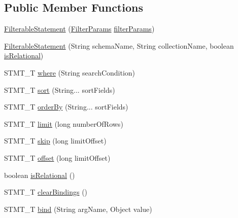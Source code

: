 \subsection*{Public Member Functions}
\begin{DoxyCompactItemize}
\item 
\mbox{\hyperlink{classcom_1_1mysql_1_1cj_1_1xdevapi_1_1_filterable_statement_a1f4bdf85b4c7e6abd086fe6b8d168b66}{Filterable\+Statement}} (\mbox{\hyperlink{classcom_1_1mysql_1_1cj_1_1xdevapi_1_1_filter_params}{Filter\+Params}} \mbox{\hyperlink{classcom_1_1mysql_1_1cj_1_1xdevapi_1_1_filterable_statement_a0004223ee831ad799fd8c17dec2dc7f9}{filter\+Params}})
\item 
\mbox{\hyperlink{classcom_1_1mysql_1_1cj_1_1xdevapi_1_1_filterable_statement_ab040aebeabb9d97f1ea205bc9c4c4230}{Filterable\+Statement}} (String schema\+Name, String collection\+Name, boolean \mbox{\hyperlink{classcom_1_1mysql_1_1cj_1_1xdevapi_1_1_filterable_statement_a0fc92f86e2ee374cbf5c7fe66d7c7dea}{is\+Relational}})
\item 
S\+T\+M\+T\+\_\+T \mbox{\hyperlink{classcom_1_1mysql_1_1cj_1_1xdevapi_1_1_filterable_statement_a358165df9da77ebe27c3b18414a13747}{where}} (String search\+Condition)
\item 
S\+T\+M\+T\+\_\+T \mbox{\hyperlink{classcom_1_1mysql_1_1cj_1_1xdevapi_1_1_filterable_statement_ad2f31a6534645c0b82b1c71693ddd8f6}{sort}} (String... sort\+Fields)
\item 
S\+T\+M\+T\+\_\+T \mbox{\hyperlink{classcom_1_1mysql_1_1cj_1_1xdevapi_1_1_filterable_statement_a33cd3395bdf36bd42e3e5c6c25b79d0e}{order\+By}} (String... sort\+Fields)
\item 
S\+T\+M\+T\+\_\+T \mbox{\hyperlink{classcom_1_1mysql_1_1cj_1_1xdevapi_1_1_filterable_statement_a563edf1d31caf5e5244fef079b37604f}{limit}} (long number\+Of\+Rows)
\item 
S\+T\+M\+T\+\_\+T \mbox{\hyperlink{classcom_1_1mysql_1_1cj_1_1xdevapi_1_1_filterable_statement_ac3e56b485f1b7ec38f0d3d57313b0e3d}{skip}} (long limit\+Offset)
\item 
S\+T\+M\+T\+\_\+T \mbox{\hyperlink{classcom_1_1mysql_1_1cj_1_1xdevapi_1_1_filterable_statement_a6ca59bb68ddc2a7900137900cdb219c8}{offset}} (long limit\+Offset)
\item 
boolean \mbox{\hyperlink{classcom_1_1mysql_1_1cj_1_1xdevapi_1_1_filterable_statement_a0fc92f86e2ee374cbf5c7fe66d7c7dea}{is\+Relational}} ()
\item 
S\+T\+M\+T\+\_\+T \mbox{\hyperlink{classcom_1_1mysql_1_1cj_1_1xdevapi_1_1_filterable_statement_a6f81659cd181c72dea83972c18438f56}{clear\+Bindings}} ()
\item 
S\+T\+M\+T\+\_\+T \mbox{\hyperlink{classcom_1_1mysql_1_1cj_1_1xdevapi_1_1_filterable_statement_af9ccf97ebcaf88f6f9317829bf8496cb}{bind}} (String arg\+Name, Object value)
\end{DoxyCompactItemize}
